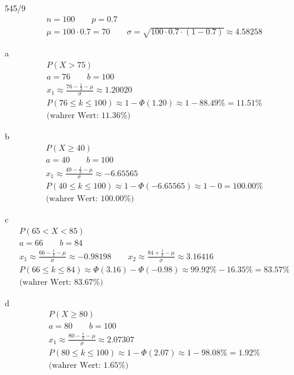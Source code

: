 \begin{exercise}{545/9}
  \begin{gather*}
    n = 100 \qquad p = 0.7 \\
    \mu = 100 \cdot 0.7 = 70 \qquad \sigma = \sqrt{100 \cdot 0.7 \cdot (1 - 0.7)} \approx 4.58258
  \end{gather*}
  \item [a]
  \begin{gather*}
    P(X > 75) \\
    a = 76 \qquad b = 100 \\
    x_1 \approx \frac{76 - \frac{1}{2} - \mu}{\sigma} \approx 1.20020 \\
    P(76 \leq k \leq 100) \approx 1 - \Phi(1.20) \approx 1 - 88.49\% = 11.51\% \\
    \text{(wahrer Wert: $11.36\%$)}
  \end{gather*}
  \item [b]
  \begin{gather*}
    P(X \geq 40) \\
    a = 40 \qquad b = 100 \\
    x_1 \approx \frac{40 - \frac{1}{2} - \mu}{\sigma} \approx -6.65565 \\
    P(40 \leq k \leq 100) \approx 1 - \Phi(-6.65565) \approx 1 - 0 = 100.00\% \\
    \text{(wahrer Wert: $100.00\%$)}
  \end{gather*}
  \item [c]
  \begin{gather*}
    P(65 < X < 85) \\
    a = 66 \qquad b = 84 \\
    x_1 \approx \frac{66 - \frac{1}{2} - \mu}{\sigma} \approx -0.98198 \qquad x_2 \approx \frac{84 + \frac{1}{2} - \mu}{\sigma} \approx 3.16416 \\
    P(66 \leq k \leq 84) \approx \Phi(3.16) - \Phi(-0.98) \approx 99.92\% - 16.35\% = 83.57\% \\
    \text{(wahrer Wert: $83.67\%$)}
  \end{gather*}
  \item [d]
  \begin{gather*}
    P(X \geq 80) \\
    a = 80 \qquad b = 100 \\
    x_1 \approx \frac{80 - \frac{1}{2} - \mu}{\sigma} \approx 2.07307 \\
    P(80 \leq k \leq 100) \approx 1 - \Phi(2.07) \approx 1 - 98.08\% = 1.92\% \\
    \text{(wahrer Wert: $1.65\%$)}
  \end{gather*}
\end{exercise}
